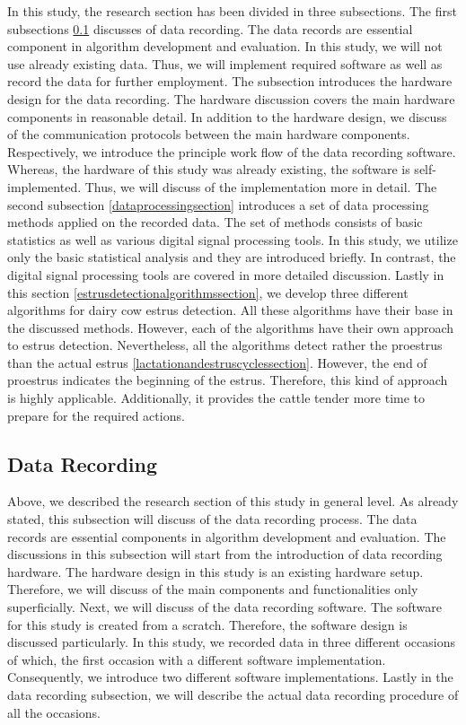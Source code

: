 \documentclass[english,12pt,a4paper,pdftex,elec,utf8]{aaltothesis}
\begin{document}
In this study, the research section has been divided in three subsections. The first subsections \ref{datarecordingsection}  discusses of data recording. The data records are essential component in algorithm development and evaluation. In this study, we will not use already existing data. Thus, we will implement required software as well as record the data for further employment. The subsection introduces the hardware design for the data recording. The hardware discussion covers the main hardware components in reasonable detail. In addition to the hardware design, we discuss of the communication protocols between the main hardware components. Respectively, we introduce the principle work flow of the data recording software. Whereas, the hardware of this study was already existing, the software is self-implemented. Thus, we will discuss of  the implementation more in detail. The second subsection \ref{dataprocessingsection} introduces a set of data processing methods applied on the recorded data. The set of methods consists of basic statistics as well as various digital signal processing tools. In this study, we utilize only the basic statistical analysis and they are introduced briefly. In contrast, the digital signal processing tools are covered in more detailed discussion. Lastly in this section \ref{estrusdetectionalgorithmssection}, we develop three different algorithms for dairy cow estrus detection. All these algorithms have their base in the discussed methods. However, each of the algorithms have their own approach to estrus detection. Nevertheless, all the algorithms detect rather the proestrus than the actual estrus \ref{lactationandestruscyclessection}. However, the end of proestrus indicates the beginning of the estrus. Therefore, this kind of approach is highly applicable. Additionally, it provides the cattle tender more time to prepare for the required actions. 

\subsection{Data Recording} \label{datarecordingsection}

Above, we described the research section of this study in general level. As already stated, this subsection will discuss of the data recording process. The data records are essential components in algorithm development and evaluation. The discussions in this subsection will start from the introduction of data recording hardware. The hardware design in this study is an existing hardware setup. Therefore, we will discuss of the main components and functionalities only superficially. Next, we will discuss of the data recording software. The software for this study is created from a scratch. Therefore, the software design is discussed particularly. In this study, we recorded data in three different occasions of which, the first occasion with a different software implementation. Consequently, we introduce two different software implementations. Lastly in the data recording subsection, we will describe the actual data recording procedure of all the occasions.
\end{document}
